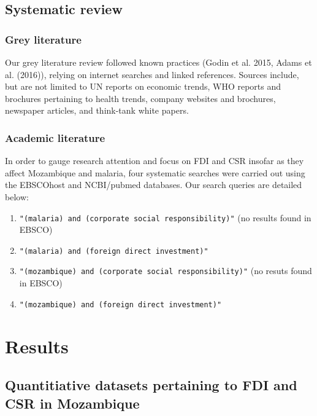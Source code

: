 \documentclass[]{elsarticle} %
\providecommand{\tightlist}{%
  \setlength{\itemsep}{0pt}\setlength{\parskip}{0pt}}
\begin{document}
\subsection{Systematic review}\label{systematic-review}

\subsubsection{Grey literature}\label{grey-literature}

Our grey literature review followed known practices (Godin et al. 2015,
Adams et al. (2016)), relying on internet searches and linked
references. Sources include, but are not limited to UN reports on
economic trends, WHO reports and brochures pertaining to health trends,
company websites and brochures, newspaper articles, and think-tank white
papers.

\subsubsection{Academic literature}\label{academic-literature}

In order to gauge research attention and focus on FDI and CSR insofar as
they affect Mozambique and malaria, four systematic searches were
carried out using the EBSCOhost and NCBI/pubmed databases. Our search
queries are detailed below:

\begin{enumerate}
\def\labelenumi{\arabic{enumi}.}
\tightlist
\item
  \texttt{"(malaria)\ and\ (corporate\ social\ responsibility)"} (no
  results found in EBSCO)
\item
  \texttt{"(malaria)\ and\ (foreign\ direct\ investment)"}
\item
  \texttt{"(mozambique)\ and\ (corporate\ social\ responsibility)"} (no
  resuts found in EBSCO)
\item
  \texttt{"(mozambique)\ and\ (foreign\ direct\ investment)"}
\end{enumerate}

\section{Results}\label{results}

\subsection{Quantitiative datasets pertaining to FDI and CSR in
Mozambique}\label{quantitiative-datasets-pertaining-to-fdi-and-csr-in-mozambique}
\end{document}

